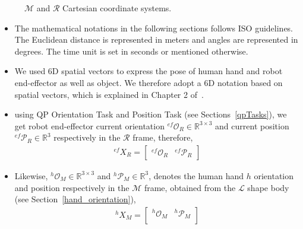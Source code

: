 \documentclass[a4paper, 12pt, oneside]{Thesis}  %
\begin{document}
\begin{figure}[ht]
	\caption{$\mathcal{M}$ and $\mathcal{R}$ Cartesian coordinate systems.}
	\label{fig:frames}
\end{figure}


\begin{itemize}
    \item The mathematical notations in the following sections follows ISO guidelines. The Euclidean distance is represented in meters and angles are represented in degrees. The time unit is set in seconds or mentioned otherwise.

    \item We used 6D spatial vectors to express the pose of human hand and robot end-effector as well as object. We therefore adopt a 6D notation based on spatial vectors, which is explained in Chapter 2 of~\cite{featherstone2014rigid}.

	\item using QP Orientation Task and Position Task (see Sections~\ref{qpTasks}), we get robot end-effector current orientation ${{}^{ef}\mathcal{O}_R} \in \mathbb{R}^{3\times3}$ and current position ${{}^{ef}\mathcal{P}_R} \in \mathbb{R}^{3}$ respectively in the $\mathcal{R}$ frame, therefore,
	\begin{gather}\label{X_R_ef}
		{}^{ef}{X}_R =
		\left[\begin{array}{cc}
		{}^{ef}\mathcal{O}_R & {}^{ef}\mathcal{P}_R
		\end{array}\right]
	\end{gather}
	
	\item Likewise, ${{}^{h}\mathcal{O}_M} \in \mathbb{R}^{3\times3}$ and ${{}^{h}\mathcal{P}_M} \in \mathbb{R}^{3}$, denotes the human hand $h$ orientation and position respectively in the $\mathcal{M}$ frame, obtained from the $\mathcal{L}$ shape body (see Section~\ref{hand_orientation}),
	\begin{gather}\label{X_M_h}
		{}^{h}{X}_M =
		\left[\begin{array}{cc}
		{}^{h}\mathcal{O}_M & {}^{h}\mathcal{P}_M \\
		\end{array}\right]
	\end{gather}


\end{itemize}
\end{document}
